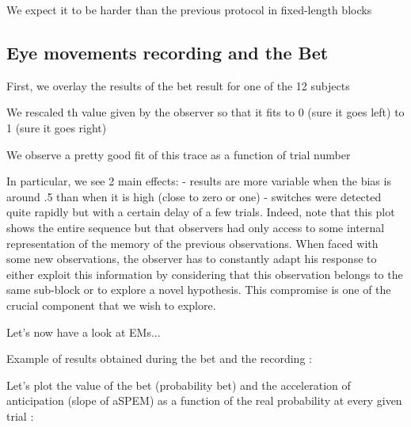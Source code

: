 \documentclass[profile,final,english, draft]{article}%
\begin{document}
We expect it to be harder than the previous protocol  in fixed-length blocks

\subsection{Eye movements recording and the Bet}

First, we overlay the results of the bet result for one of the 12 subjects

We rescaled th value given by the observer so that it fits to 0 (sure it goes left) to 1 (sure it goes right)

We observe a pretty good fit of this trace as a function of trial number


In particular, we see 2 main effects:
- results are more variable when the bias is around .5 than when it is high (close to zero or one)
- switches were detected quite rapidly but with a certain delay of a few trials. Indeed, note that this plot shows the entire sequence but that observers had only access to some internal representation of the memory of the previous observations. When faced with some new observations, the observer has to constantly adapt his response to either exploit this information by considering that this observation belongs to the same sub-block or to explore a novel hypothesis. This compromise is one of the crucial component that we wish to explore.

Let's now have a look at EMs...

Example of results obtained during the bet and the recording :




Let's plot the value of the bet (probability bet)  and the acceleration of anticipation (slope of aSPEM) as a function of the real probability at every given trial :
%
\end{document}
